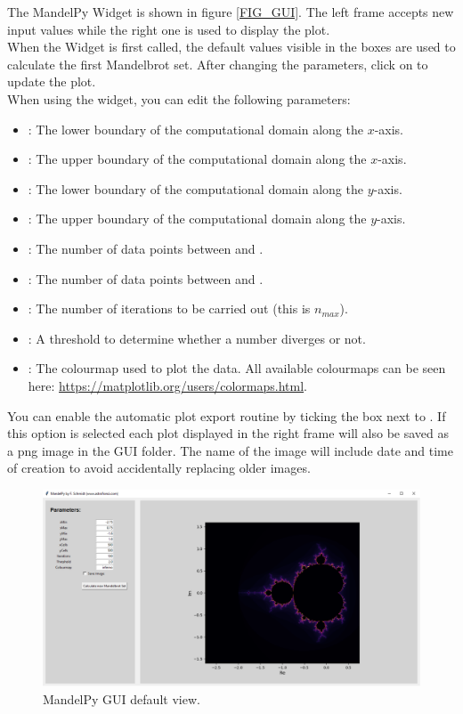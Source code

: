 \documentclass[
  12pt,					%
  a4paper,				%
  twoside,				%
]{report}
\begin{document}
The MandelPy Widget is shown in figure \ref{FIG_GUI}. The left frame accepts new input values while the right one is used to display the plot.\\
When the Widget is first called, the default values visible in the boxes are used to calculate the first Mandelbrot set. After changing the parameters, click on {} to update the plot.\\
When using the widget, you can edit the following parameters:
\begin{itemize}
	\item {}: The lower boundary of the computational domain along the $x$-axis.
	\item {}: The upper boundary of the computational domain along the $x$-axis.
	\item {}: The lower boundary of the computational domain along the $y$-axis.
	\item {}: The upper boundary of the computational domain along the $y$-axis.
	\item {}: The number of data points between {} and {}.
	\item {}: The number of data points between {} and {}.
	\item {}: The number of iterations to be carried out (this is $n_{max}$).
	\item {}: A threshold to determine whether a number diverges or not.
	\item {}: The colourmap used to plot the data. All available colourmaps can be seen here: \url{https://matplotlib.org/users/colormaps.html}.
\end{itemize}

You can enable the automatic plot export routine by ticking the box next to {}. If this option is selected each plot displayed in the right frame will also be saved as a png image in the GUI folder. The name of the image will include date and time of creation to avoid accidentally replacing older images.\\

\begin{figure}[H]
		\centering
		\includegraphics[width=\textwidth]{IMG/GUI.png}
		\caption{MandelPy GUI default view.}
\end{figure}\label{FIG_GUI}
\end{document}
